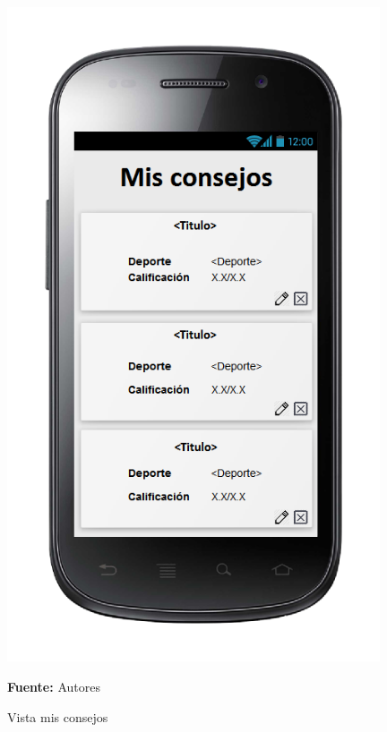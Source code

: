 \begin{figure}[!htb]
  \begin{center}
\includegraphics[width=11cm]{./imagenes/UI/Contenidos/mis_consejos.png}
    \caption{Vista mis consejos}
    \label{fig:Vista_mis_consejos}
    \textbf{Fuente:}  Autores
  \end{center}
\end{figure}
